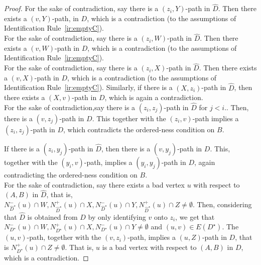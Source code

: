 \documentclass[a4paper,11pt]{article}
\theoremstyle{plain}
\newtheorem{identification rule}{Identification Rule}
\theoremstyle{definition}
\theoremstyle{remark}
\begin{document}
\begin{proof}
 For the sake of contradiction, say there is a $(z_i,Y)$-path in $\widehat{D}$. 
Then there exists a $(v,Y)$-path, in $D$, which is a contradiction (to the assumptions of Identification Rule~\ref{ir:emptyC}).\\

 For the sake of contradiction, say there is a $(z_i,W)$-path in $\widehat{D}$. 
Then there exists a $(v,W)$-path in $D$, which is a contradiction (to the assumptions of Identification Rule~\ref{ir:emptyC}).\\

 For the sake of contradiction, 
say there is a $(z_i,X)$-path in $\widehat{D}$. 
Then there exists a $(v,X)$-path in $D$, which is a contradiction (to the assumptions of Identification Rule~\ref{ir:emptyC}). Similarly,  if there is a $(X,z_i)$-path in $\widehat{D}$, then there exists a $(X,v)$-path in $D$, which is again a contradiction.\\

For the sake of contradiction,say there is a $(z_i,z_j)$-path in $\widehat{D}$ for $j <i$.. Then, there is a $(v,z_j)$-path in $D$. This together with the $(z_i,v)$-path implies a $(z_i,z_j)$-path in $D$, which contradicts the ordered-ness condition on $B$.

If there is a $(z_i,y_j)$-path in $\widehat{D}$,
then there is a $(v,y_j)$-path in $D$. This, together with the $(y_i,v)$-path, implies a $(y_i,y_j)$-path in $D$, again contradicting the ordered-ness condition on $B$.\\

 For the sake of contradiction, say there exists a bad vertex $u$ with respect to $(A,B)$ in $\widehat{D}$, that is, $N_{\widehat{D}^{\star}}^-(u) \cap W, N_{\widehat{D}^{\star}}^+(u) \cap X, N_{\widehat{D}^{\star}}^-(u) \cap Y, N_{\widehat{D}^{\star}}^+(u) \cap Z \neq \emptyset$. 
Then, considering that $\widehat{D}$ is obtained from $D$ by only identifying $v$ onto $z_i$, we get that
$N_{D^{\star}}^-(u) \cap W, N_{D^{\star}}^+(u) \cap X, N_{D^{\star}}^-(u) \cap Y \neq \emptyset$ and $(u,v) \in E(D^{\star})$.  The $(u,v)$-path, together with the $(v,z_i)$-path, implies a $(u,Z)$-path in $D$, that is $N_{D^{\star}}^+(u) \cap Z \neq \emptyset$. That is, $u$ is a bad vertex with respect to $(A,B)$ in $D$, which is a contradiction.
\end{proof}
\end{document}
